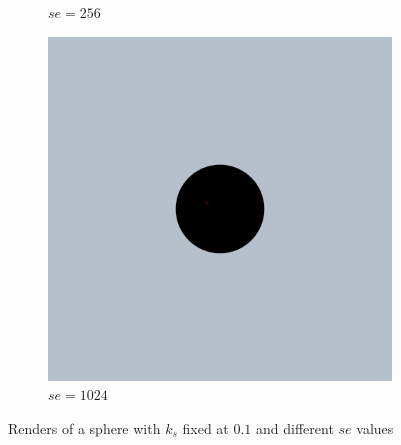 \documentclass{article}
\begin{document}
\begin{figure}[h!]
\begin{subfigure}{0.2\textwidth}
		\caption{$se = 256$}
		\label{fig:specular_0_1_256}
	\end{subfigure}%
	\hfill
	\begin{subfigure}{0.2\textwidth}
		\includegraphics[width=\textwidth]{specular_sc_0_1_se_1024}
		\caption{$se = 1024$}
		\label{fig:specular_0_1_1024}
	\end{subfigure}%
	\hfill
	
	\caption{Renders of a sphere with $k_{s}$ fixed at $0.1$ and different $se$ values}
	\label{fig:specular_0_1}
\end{figure}
\end{document}
